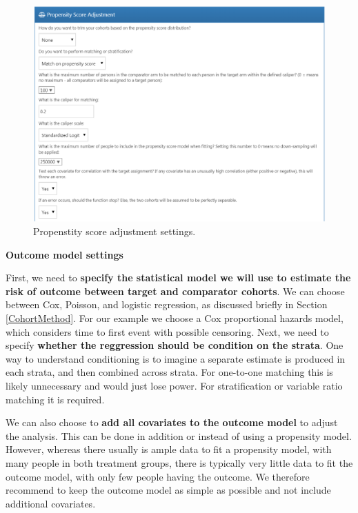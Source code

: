 \documentclass[11pt]{book}
\begin{document}
\begin{figure}

{\centering \includegraphics[width=1\linewidth]{images/PopulationLevelEstimation/psSettings} 

}

\caption{Propenstity score adjustment settings.}\label{fig:psSettings}
\end{figure}

\textbf{Outcome model settings}

First, we need to \textbf{specify the statistical model we will use to
estimate the risk of outcome between target and comparator cohorts}. We
can choose between Cox, Poisson, and logistic regression, as discussed
briefly in Section \ref{CohortMethod}. For our example we choose a Cox
proportional hazards model, which considers time to first event with
possible censoring. Next, we need to specify \textbf{whether the
reggression should be condition on the strata}. One way to understand
conditioning is to imagine a separate estimate is produced in each
strata, and then combined across strata. For one-to-one matching this is
likely unnecessary and would just lose power. For stratification or
variable ratio matching it is required.

We can also choose to \textbf{add all covariates to the outcome model}
to adjust the analysis. This can be done in addition or instead of using
a propensity model. However, whereas there usually is ample data to fit
a propensity model, with many people in both treatment groups, there is
typically very little data to fit the outcome model, with only few
people having the outcome. We therefore recommend to keep the outcome
model as simple as possible and not include additional covariates.
\end{document}
